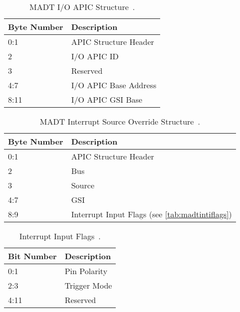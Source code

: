 \begin{table}[H]
  \centering
  \begin{tabularx}{1.0\textwidth}{| X | X |}
    \hline
    \textbf{Byte Number} & \textbf{Description}  \\ \hline\hline
    0:1                  & APIC Structure Header \\ \hline
    2                    & I/O APIC ID           \\ \hline
    3                    & Reserved              \\ \hline
    4:7                  & I/O APIC Base Address \\ \hline
    8:11                 & I/O APIC GSI Base     \\ \hline
  \end{tabularx}
  \caption{MADT I/O APIC Structure~\cite[sec.~5.2.8.2]{acpi1}.}
  \label{tab:madtioapic}
\end{table}

\begin{table}[H]
  \centering
  \begin{tabularx}{1.0\textwidth}{| X | X |}
    \hline
    \textbf{Byte Number} & \textbf{Description}                                    \\ \hline\hline
    0:1                  & APIC Structure Header                                   \\ \hline
    2                    & Bus                                                     \\ \hline
    3                    & Source                                                  \\ \hline
    4:7                  & GSI                                                     \\ \hline
    8:9                  & Interrupt Input Flags (see \autoref{tab:madtintiflags}) \\ \hline
  \end{tabularx}
  \caption{MADT Interrupt Source Override Structure~\cite[sec.~5.2.8.3.1]{acpi1}.}
  \label{tab:madtirqoverride}
\end{table}

\begin{table}[H]
  \centering
  \begin{tabularx}{1.0\textwidth}{| X | X |}
    \hline
    \textbf{Bit Number} & \textbf{Description} \\ \hline\hline
    0:1                 & Pin Polarity         \\ \hline
    2:3                 & Trigger Mode         \\ \hline
    4:11                & Reserved             \\ \hline
  \end{tabularx}
  \caption{Interrupt Input Flags~\cite[sec.~5.2.8.3.1]{acpi1}.}
  \label{tab:madtintiflags}
\end{table}

